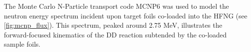 \documentclass[5p]{elsarticle}
\newcommand{\comment}[1]{\todo[color=blue!20!white,inline]{ASV: #1}}
\begin{document}


The Monte Carlo N-Particle transport code  MCNP6 \cite{goorley2013initial} was used to model the neutron energy spectrum incident upon target foils co-loaded into the HFNG (see \autoref{fig:mcnp_flux}).
This spectrum, peaked around 2.75 MeV, illustrates the forward-focused kinematics of the DD reaction subtended by the co-loaded sample foils.



\end{document}
